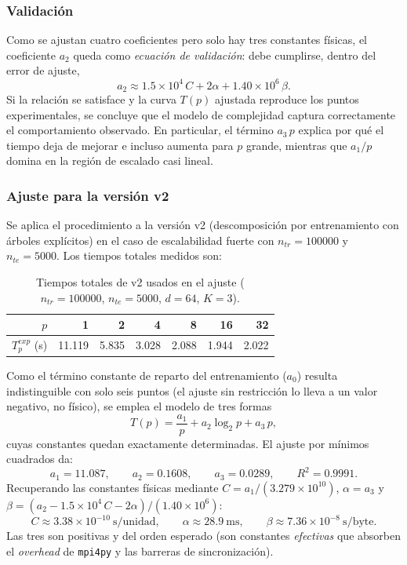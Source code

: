 \documentclass[11pt,a4paper]{article}
\begin{document}
\subsubsection{Validación}

Como se ajustan cuatro coeficientes pero solo hay tres constantes físicas, el coeficiente $a_2$
queda como \emph{ecuación de validación}: debe cumplirse, dentro del error de ajuste,
\[
a_2 \approx 1.5\times10^4\,C + 2\alpha + 1.40\times10^6\,\beta.
\]
Si la relación se satisface y la curva $T(p)$ ajustada reproduce los puntos experimentales, se
concluye que el modelo de complejidad captura correctamente el comportamiento observado. En
particular, el término $a_3\,p$ explica por qué el tiempo deja de mejorar e incluso aumenta para
$p$ grande, mientras que $a_1/p$ domina en la región de escalado casi lineal.

\subsubsection{Ajuste para la versión v2}\label{sec:norm-v2}

Se aplica el procedimiento a la versión v2 (descomposición por entrenamiento con árboles
explícitos) en el caso de escalabilidad fuerte con $n_{tr}=100000$ y $n_{te}=5000$. Los tiempos
totales medidos son:

\begin{table}[H]
\centering
\begin{tabular}{rrrrrrr}
\toprule
$p$ & 1 & 2 & 4 & 8 & 16 & 32 \\
\midrule
$T_p^{exp}$ (s) & 11.119 & 5.835 & 3.028 & 2.088 & 1.944 & 2.022 \\
\bottomrule
\end{tabular}
\caption{Tiempos totales de v2 usados en el ajuste ($n_{tr}=100000$, $n_{te}=5000$, $d=64$, $K=3$).}
\end{table}

Como el término constante de reparto del entrenamiento ($a_0$) resulta indistinguible con solo seis
puntos (el ajuste sin restricción lo lleva a un valor negativo, no físico), se emplea el modelo de
tres formas
\[
T(p) = \frac{a_1}{p} + a_2\log_2 p + a_3\,p,
\]
cuyas constantes quedan exactamente determinadas. El ajuste por mínimos cuadrados da:
\[
a_1 = 11.087,
\qquad
a_2 = 0.1608,
\qquad
a_3 = 0.0289,
\qquad
R^2 = 0.9991.
\]
Recuperando las constantes físicas mediante $C = a_1/(3.279\times10^{10})$, $\alpha = a_3$ y
$\beta = (a_2 - 1.5\times10^4\,C - 2\alpha)/(1.40\times10^6)$:
\[
C \approx 3.38\times10^{-10}\ \text{s/unidad},
\qquad
\alpha \approx 28.9\ \text{ms},
\qquad
\beta \approx 7.36\times10^{-8}\ \text{s/byte}.
\]
Las tres son positivas y del orden esperado (son constantes \emph{efectivas} que absorben el
\emph{overhead} de \texttt{mpi4py} y las barreras de sincronización).
\end{document}
